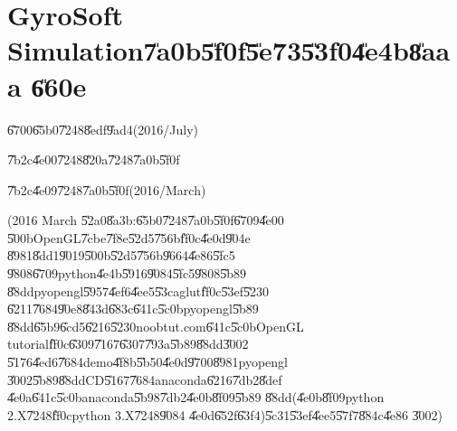                       

\part{GyroSoft Simulation\U{7a0b}\U{5f0f}\U{5e73}\U{53f0}\U{4e4b}\U{8aaa}%
\U{660e}}

\setcounter{page}{1}

\bigskip

\U{6700}\U{65b0}\U{7248}\U{8edf}\U{9ad4}(2016/July)

\href{https://github.com/whymranderson/cordtrans}{\underline{\color{blue}%
}}

\U{7b2c}\U{4e00}\U{7248}\U{820a}\U{7248}\U{7a0b}\U{5f0f}

\href{https://github.com/whymranderson/cordtrans/tree/test_1_github}{%
\underline{\color{blue}%
}}

\U{7b2c}\U{4e09}\U{7248}\U{7a0b}\U{5f0f}(2016/March)

\href{https://github.com/whymranderson/cordtrans/tree/GS_version_3}{%
\underline{\color{blue}%
}}

\bigskip

(2016 March \U{52a0}\U{8a3b}:\U{65b0}\U{7248}\U{7a0b}\U{5f0f}\U{6709}\U{4e00}%
\U{500b}OpenGL\U{7cbe}\U{7f8e}\U{52d5}\U{756b}\U{ff0c}\U{4e0d}\U{904e}%
\U{8981}\U{8dd1}\U{9019}\U{500b}\U{52d5}\U{756b}\U{9664}\U{4e86}\U{5fc5}%
\U{9808}\U{6709}python\U{4e4b}\U{5916}\U{9084}\U{5fc5}\U{9808}\U{5b89}%
\U{88dd}pyopengl\U{5957}\U{4ef6}\U{4ee5}\U{53ca}glut\U{ff0c}\U{53ef}\U{5230}%
\U{6211}\U{7684}\U{90e8}\U{843d}\U{683c}\U{641c}\U{5c0b}pyopengl\U{5b89}%
\U{88dd}\U{65b9}\U{6cd5}\U{6216}\U{5230}noobtut.com\U{641c}\U{5c0b}OpenGL
tutorial\U{ff0c}\U{6309}\U{7167}\U{6307}\U{793a}\U{5b89}\U{88dd}\U{3002}%
\U{5176}\U{4ed6}\U{7684}demo\U{4f8b}\U{5b50}\U{4e0d}\U{9700}\U{8981}pyopengl%
\U{3002}\U{5b89}\U{88dd}CD\U{5167}\U{7684}anaconda\U{6216}\U{7db2}\U{8def}%
\U{4e0a}\U{641c}\U{5c0b}anaconda\U{5b98}\U{7db2}\U{4e0b}\U{8f09}\U{5b89}%
\U{88dd}(\U{4e0b}\U{8f09}python 2.X\U{7248}\U{ff0c}python 3.X\U{7248}\U{9084}%
\U{4e0d}\U{652f}\U{63f4})\U{5c31}\U{53ef}\U{4ee5}\U{57f7}\U{884c}\U{4e86}%
\U{3002})

\bigskip

